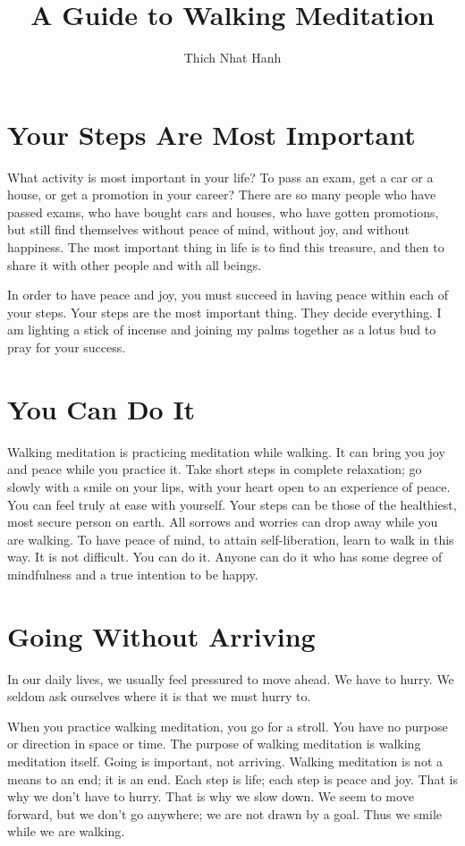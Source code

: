 \documentclass[a4paper,12pt,twocolumn]{article}
\title{A Guide to Walking Meditation}
\author{Thich Nhat Hanh}
\begin{document}
\maketitle


\section{Your Steps Are Most Important}

What activity is most important in your life?  To pass an exam, get a car or a house, or get a promotion in your career?  There are so many people who have passed exams, who have bought cars and houses, who have gotten promotions, but still find themselves without peace of mind, without joy, and without happiness.  The most important thing in life is to find this treasure, and then to share it with other people and with all beings. 

In order to have peace and joy, you must succeed in having peace within each of your steps.  Your steps are the most important thing.  They decide everything.  I am lighting a stick of incense and joining my palms together as a lotus bud to pray for your success.

\section{You Can Do It}

  Walking meditation is practicing meditation while walking.  It can bring you joy and peace while you practice it.  Take short steps in complete relaxation; go slowly with a smile on your lips, with your heart open to an experience of peace.  You can feel truly at ease with yourself.  Your steps can be those of the healthiest, most secure person on earth.  All sorrows and worries can drop away while you are walking.  To have peace of mind, to attain self-liberation, learn to walk in this
  way.  It is not difficult.  You can do it.  Anyone can do it who has some degree of mindfulness and a true intention to be happy.

 \section{Going Without Arriving}

  In our daily lives, we usually feel pressured to move ahead.  We have to hurry.  We seldom ask ourselves where it is that we must hurry to. 

  When you practice walking meditation, you go for a stroll.  You have no purpose or direction in space or time.  The purpose of walking meditation is walking meditation itself.  Going is important, not arriving.  Walking meditation is not a means to an end; it is an end.  Each step is life; each step is peace and joy.  That is why we don’t have to hurry.  That is why we slow down.  We seem to move forward, but we don’t go anywhere; we are not drawn by a goal.  Thus we smile while we are
  walking.
\end{document}
